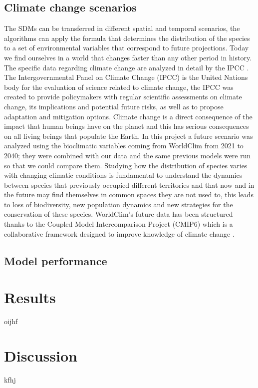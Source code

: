 \documentclass[12pt,a4paper]{article}
\begin{document}
\subsection{Climate change scenarios}
The SDMs can be transferred in different spatial and temporal scenarios, the algorithms can apply the formula that determines the distribution of the species to a set of environmental variables that correspond to future projections.
Today we find ourselves in a world that changes faster than any other period in history.    
The specific data regarding climate change are analyzed in detail by the IPCC \citep{ipcc}.
The Intergovernmental Panel on Climate Change (IPCC) is the United Nations body for the evaluation of science related to climate change, the IPCC was created to provide policymakers with regular scientific assessments on climate change, its implications and potential future risks, as well as to propose adaptation and mitigation options\citep{ipcc}.
Climate change is a direct consequence of the impact that human beings have on the planet and this has serious consequences on all living beings that populate the Earth.
In this project a future scenario was analyzed using the bioclimatic variables coming from WorldClim \citep{cmi} from 2021 to 2040; they were combined with our data and the same previous models were run so that we could compare them.
Studying how the distribution of species varies with changing climatic conditions is fundamental to understand the dynamics between species that previously occupied different territories and that now and in the future may find themselves in common spaces they are not used to, this leads to loss of biodiversity, new population dynamics and new strategies for the conservation of these species.
WorldClim's future data has been structured thanks to the Coupled Model Intercomparison Project (CMIP6) which is a collaborative framework designed to improve knowledge of climate change \citep{CMIP6}.


\subsection{Model performance}

\newpage
\section{Results}
oijhf

\newpage
\section{Discussion}
kfhj
\end{document}
